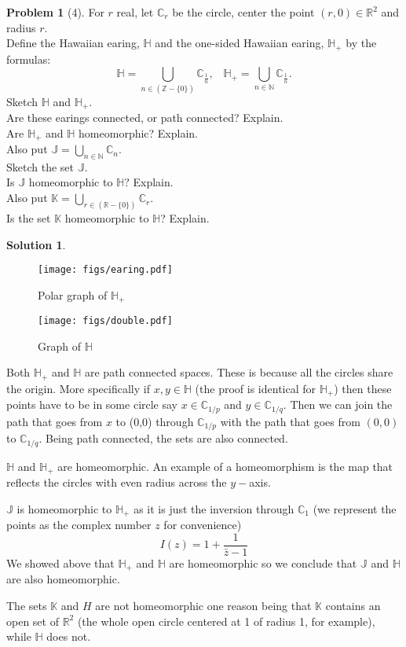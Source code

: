 \documentclass{article}
\theoremstyle{definition}
\newtheorem*{soln}{Solution}
\newtheorem*{prob}{Problem}
\theoremstyle{theorem}
\newcommand{\R}{\mathbb{R}}
\newcommand{\J}{\mathbb{J}}
\newcommand{\C}{\mathbb{C}}
\newcommand{\K}{\mathbb{K}}
\newcommand{\HP}{\mathbb{H}}
\begin{document}
\begin{prob}[4]
For $r$ real, let $\mathbb{C}_r$ be the circle, center the point  $(r, 0) \in \mathbb{R}^2$ and radius $r$. \\ Define the Hawaiian earing, $\mathbb{H}$ and the one-sided Hawaiian earing, $\mathbb{H}_+$ by the formulas:
\[ \mathbb{H} =   \bigcup_{n \in (\mathbb{Z} - \{0\})} \mathbb{C}_{\frac{1}{n}}, \hspace{10pt} \mathbb{H}_+ =   \bigcup_{n \in \mathbb{N}} \mathbb{C}_{\frac{1}{n}}. \] 
Sketch $\mathbb{H}$ and $\mathbb{H}_+$.\\
Are these earings connected, or path connected? Explain. \\
Are $\mathbb{H}_+$ and $\mathbb{H}$ homeomorphic? Explain.\\
Also put $\mathbb{J} =  \bigcup_{n \in \mathbb{N}} \mathbb{C}_{n}$.\\
Sketch the set $\mathbb{J}$.\\
Is $\mathbb{J}$ homeomorphic to $\mathbb{H}$? Explain.\\
Also put $\mathbb{K} =  \bigcup_{r \in (\mathbb{R} - \{0\})} \mathbb{C}_{r}$.\\
Is the set $\mathbb{K}$ homeomorphic to $\mathbb{H}$? Explain.


\end{prob}
\begin{soln}

            \begin{figure}
  \centering
    \texttt{[image: figs/earing.pdf]}
  \caption{Polar graph of $\HP_+$}
\end{figure}
            \begin{figure}
  \centering
    \texttt{[image: figs/double.pdf]}
                \caption{Graph of $\HP$}
\end{figure}

    Both $\HP_+$ and $\HP$ are path connected spaces. These is because all the circles share the origin. More specifically if $x,y\in\HP$ (the proof is identical for $\HP_+$) then these points have to be in some circle say $x\in \C_{1/p}$ and $y\in \C_{1/q}$. Then we can join the path that goes from $x$ to (0,0) through $\C_{1/p} $ with the path that goes from $(0,0)$ to $\C_{1/q}$. Being path connected, the sets are also connected.

    $\HP$ and $\HP_+$ are homeomorphic. An example of a homeomorphism is the map that reflects the circles with even radius across the $y-$axis.

    $\J$ is homeomorphic to $\HP_+$ as it is just the inversion through $\C_1$ (we represent the points as the complex number $z$ for convenience)
    $$I(z) = 1 + \frac 1{\bar z - 1}$$ 
    We showed above that $\HP_+$ and $\HP$ are homeomorphic so we conclude that $\J$ and $\HP$ are also homeomorphic. 

    The sets $\K$ and $H$ are not homeomorphic one reason being that $\K$ contains an open set of $\R^2$ (the whole open circle centered at 1 of radius 1, for example), while $\HP$ does not.
\end{soln}
\vspace{1in}
\end{document}
